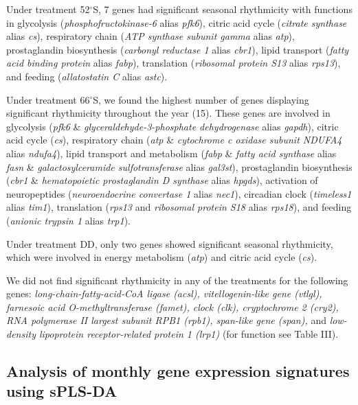 

Under treatment 52$^{\circ}$S, 7 genes had significant seasonal rhythmicity
with functions in glycolysis (\textit{phosphofructokinase-6} alias
\textit{pfk6}), citric acid cycle (\textit{citrate synthase} alias
\textit{cs}),  respiratory chain (\textit{ATP synthase subunit gamma} alias
\textit{atp}), prostaglandin biosynthesis (\textit{carbonyl reductase 1} alias
\textit{cbr1}), lipid transport (\textit{fatty acid binding protein} alias
\textit{fabp}), translation (\textit{ribosomal protein S13} alias
\textit{rps13}), and feeding (\textit{allatostatin C} alias \textit{astc}).

Under treatment 66$^{\circ}$S, we found the highest number of genes displaying
significant rhythmicity throughout the year (15). These genes are involved in
glycolysis (\textit{pfk6} \& \textit{glyceraldehyde-3-phosphate dehydrogenase}
alias \textit{gapdh}), citric acid cycle (\textit{cs}), respiratory chain
(\textit{atp} \& \textit{cytochrome c oxidase subunit NDUFA4} alias
\textit{ndufa4}), lipid transport and metabolism (\textit{fabp} \&
\textit{fatty acid synthase} alias \textit{fasn} \& \textit{galactosylceramide
sulfotransferase} alias \textit{gal3st}), prostaglandin biosynthesis
(\textit{cbr1} \& \textit{hematopoietic prostaglandin D synthase} alias
\textit{hpgds}), activation of neuropeptides (\textit{neuroendocrine convertase
1} alias \textit{nec1}), circadian clock (\textit{timeless1} alias
\textit{tim1}), translation (\textit{rps13} and \textit{ribosomal protein S18}
alias \textit{rps18}), and feeding (\textit{anionic trypsin 1} alias
\textit{trp1}).

Under treatment DD, only two genes showed significant seasonal rhythmicity,
which were involved in energy metabolism (\textit{atp}) and citric acid cycle
(\textit{cs}). 

We did not find significant rhythmicity in any of the treatments for the
following genes: \textit{long-chain-fatty-acid-CoA ligase (acsl),
vitellogenin-like gene (vtlgl), farnesoic acid O-methyltransferase (famet),
clock (clk), cryptochrome 2 (cry2), RNA polymerase II largest subunit RPB1
(rpb1), span-like gene (span),} and \textit{low-density lipoprotein
receptor-related protein 1 (lrp1)} (for function see Table III).

\subsection{Analysis of monthly gene expression signatures using sPLS-DA}

